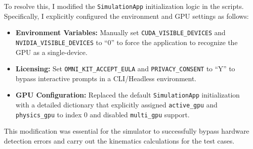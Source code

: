 \documentclass{article}
\begin{document}
To resolve this, I modified the \texttt{SimulationApp} initialization logic in the scripts. 
Specifically, I explicitly configured the environment and GPU settings as follows:
\begin{itemize}
    \item \textbf{Environment Variables:} Manually set \texttt{CUDA\_VISIBLE\_DEVICES} and 
    \texttt{NVIDIA\_VISIBLE\_DEVICES} to ``0'' to force the application to recognize the GPU as a single-device.
    \item \textbf{Licensing:} Set \texttt{OMNI\_KIT\_ACCEPT\_EULA} and 
    \texttt{PRIVACY\_CONSENT} to ``Y'' to bypass interactive prompts in a CLI/Headless environment.
    \item \textbf{GPU Configuration:} Replaced the default \texttt{SimulationApp} 
    initialization with a detailed dictionary that explicitly assigned 
    \texttt{active\_gpu} and \texttt{physics\_gpu} to index 0 and disabled 
    \texttt{multi\_gpu} support.
\end{itemize}
This modification was essential for the simulator to successfully bypass hardware detection 
errors and carry out the kinematics calculations for the test cases.
\end{document}
